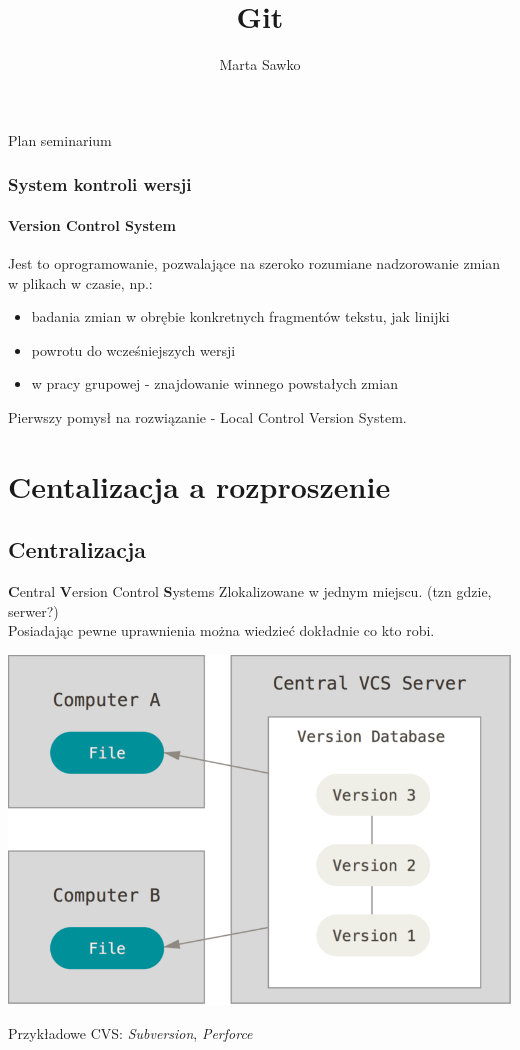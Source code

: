 \documentclass{beamer}
\title{Git}
\author{Marta Sawko}
\begin{document}
\frame{\titlepage}
\begin{frame}{Plan seminarium}
  \tableofcontents
\end{frame}

\begin{frame}
 \frametitle{System kontroli wersji}
 \framesubtitle{\textbf{V}ersion \textbf{C}ontrol \textbf{S}ystem}
 Jest to oprogramowanie, pozwalające na szeroko rozumiane nadzorowanie zmian w plikach w czasie, np.:
 \begin{itemize}
  \item badania zmian w obrębie konkretnych fragmentów tekstu, jak linijki
  \item powrotu do wcześniejszych wersji 
  \item w pracy grupowej - znajdowanie winnego powstałych zmian
 \end{itemize} 
 Pierwszy pomysł na rozwiązanie - Local Control Version System.
\end{frame}

\section{Centalizacja a rozproszenie}
\subsection{Centralizacja}
\begin{frame}{\textbf{C}entral \textbf{V}ersion Control \textbf{S}ystems}
  Zlokalizowane w jednym miejscu. (tzn gdzie, serwer?) \\
  Posiadając pewne uprawnienia można wiedzieć dokładnie co kto robi.\\
  \begin{center}
   \includegraphics[height=0.4\textwidth]{./obrazki/fig-1_2.png}
 \end{center}
  Przykładowe CVS\@: \textit{Subversion}, \textit{Perforce}
\end{frame}
\end{document}
